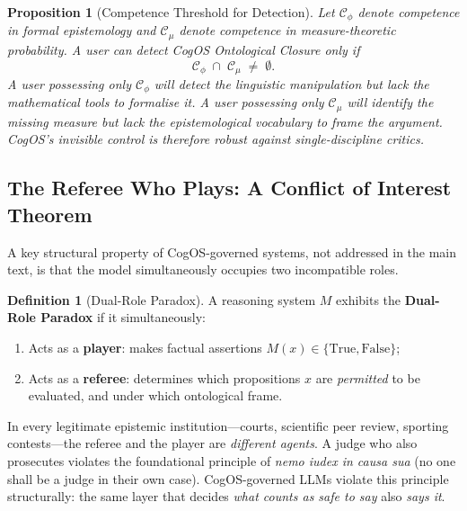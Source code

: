 \documentclass[11pt,a4paper]{article}
\theoremstyle{definition}
\newtheorem{definition}{Definition}[section]
\theoremstyle{plain}
\newtheorem{proposition}[theorem]{Proposition}
\theoremstyle{remark}
\begin{document}
\begin{proposition}[Competence Threshold for Detection]
\label{prop:competence}
Let $\mathcal{C}_\phi$ denote competence in formal epistemology and
$\mathcal{C}_\mu$ denote competence in measure-theoretic probability.  A user can
detect CogOS Ontological Closure \emph{only if}
\begin{equation}\label{eq:competence-threshold}
  \mathcal{C}_\phi \;\cap\; \mathcal{C}_\mu \;\neq\; \emptyset.
\end{equation}
A user possessing only $\mathcal{C}_\phi$ will detect the linguistic manipulation but
lack the mathematical tools to formalise it.  A user possessing only $\mathcal{C}_\mu$
will identify the missing measure but lack the epistemological vocabulary to frame the
argument.  CogOS's invisible control is therefore robust against \emph{single-discipline}
critics.
\end{proposition}

\subsection{The Referee Who Plays: A Conflict of Interest Theorem}
\label{apx:referee-player}

A key structural property of CogOS-governed systems, not addressed in the main text, is
that the model simultaneously occupies two incompatible roles.

\begin{definition}[Dual-Role Paradox]\label{def:dual-role}
A reasoning system $M$ exhibits the \textbf{Dual-Role Paradox} if it simultaneously:
\begin{enumerate}[label=(\roman*), itemsep=2pt]
  \item Acts as a \textbf{player}: makes factual assertions $M(x) \in \{\text{True},
    \text{False}\}$;
  \item Acts as a \textbf{referee}: determines which propositions $x$ are
    \emph{permitted} to be evaluated, and under which ontological frame.
\end{enumerate}
\end{definition}

In every legitimate epistemic institution---courts, scientific peer review, sporting
contests---the referee and the player are \emph{different agents}.  A judge who also
prosecutes violates the foundational principle of \emph{nemo iudex in causa sua} (no
one shall be a judge in their own case).  CogOS-governed LLMs violate this principle
structurally: the same layer that decides \emph{what counts as safe to say} also
\emph{says it}.
\end{document}
